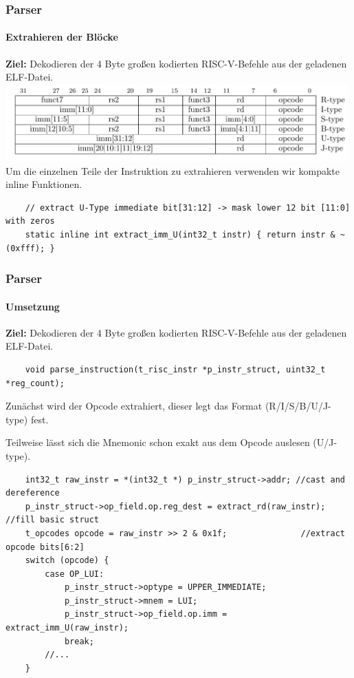 \documentclass[german]{tum-presentation}
\begin{document}
\begin{frame}[fragile]
	\frametitle{Parser}
	\framesubtitle{Extrahieren der Blöcke}
	\textbf{Ziel:} Dekodieren der 4 Byte großen kodierten RISC-V-Befehle aus der geladenen ELF-Datei.
	\includegraphics[width=0.99\textwidth]{diagrams/optypes}
	\pause
	Um die einzelnen Teile der Instruktion zu extrahieren verwenden wir kompakte inline Funktionen. 
	\begin{lstlisting}
	// extract U-Type immediate bit[31:12] -> mask lower 12 bit [11:0] with zeros
	static inline int extract_imm_U(int32_t instr) { return instr & ~(0xfff); }
	\end{lstlisting}
\end{frame}

\begin{frame}[fragile]
	\frametitle{Parser}
	\framesubtitle{Umsetzung}
	\textbf{Ziel:} Dekodieren der 4 Byte großen kodierten RISC-V-Befehle aus der geladenen ELF-Datei.
	\begin{lstlisting}
	void parse_instruction(t_risc_instr *p_instr_struct, uint32_t *reg_count);
	\end{lstlisting}
	Zunächst wird der Opcode extrahiert, dieser legt das Format (R/I/S/B/U/J-type) fest.
	
	Teilweise lässt sich die Mnemonic schon exakt aus dem Opcode auslesen (U/J-type).
	\begin{lstlisting}
    int32_t raw_instr = *(int32_t *) p_instr_struct->addr; //cast and dereference
    p_instr_struct->op_field.op.reg_dest = extract_rd(raw_instr);      //fill basic struct
    t_opcodes opcode = raw_instr >> 2 & 0x1f;				//extract opcode bits[6:2]
    switch (opcode) {
        case OP_LUI:
            p_instr_struct->optype = UPPER_IMMEDIATE;
            p_instr_struct->mnem = LUI;
            p_instr_struct->op_field.op.imm = extract_imm_U(raw_instr);
            break;
        //...
    }
	\end{lstlisting}
\end{frame}
\end{document}
